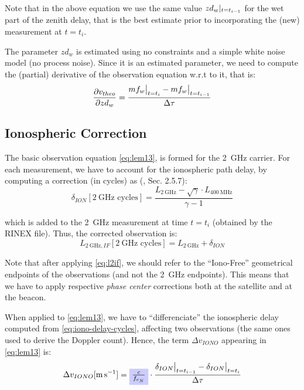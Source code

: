 Note that in the above equation we use the same value $zd_{w}\at{t=t_{i-1}}$ 
for the wet part of the zenith delay, that is the best estimate prior to 
incorporating the (new) measurement at $t=t_i$.

The parameter $zd_{w}$ is estimated using no constraints and a simple white 
noise model (no process noise). Since it is an estimated parameter, we need 
to compute the (partial) derivative of the observation equation w.r.t to it, 
that is:
\begin{equation}
  \frac{\partial v_{theo}}{\partial zd_{w}} = \frac{mf_{w}\at[\big]{t=t_i} 
    - mf_{w}\at[\big]{t=t_{i-1}}}{\Delta \tau}
\end{equation}

\subsection{Ionospheric Correction}
\label{ssec:iono-correction}
The basic observation equation \ref{eq:lem13}, is formed for the \SI{2}{\GHz} 
carrier. For each measurement, we have to account for the ionospheric path 
delay, by computing a correction (in cycles) as (\cite{lemoine-2016}, Sec. 2.5.7):
\begin{equation}
  \delta_{ION} [\SI{2}{\GHz}\text{ cycles}] = 
    \frac{L_{\SI{2}{\GHz}} - \sqrt{\gamma} \cdot L_{\SI{400}{\MHz}}}{\gamma - 1}
  \label{eq:iono-delay-cycles}
\end{equation}

which is added to the \SI{2}{\GHz} measurement at time $t=t_i$ (obtained by the 
RINEX file). Thus, the corrected observation is:
\begin{equation}
  L_{\SI{2}{\GHz},IF} [\SI{2}{\GHz}\text{ cycles}] = 
    L_{\SI{2}{\GHz}} + \delta_{ION}
  \label{eq:l2if}
\end{equation}

Note that after applying \ref{eq:l2if}, we should refer to the ``Iono-Free'' 
geometrical endpoints of the observations (and not the \SI{2}{\GHz} endpoints). 
This means that we have to apply respective \emph{phase center} corrections 
both at the satellite and at the beacon.

When applied to \ref{eq:lem13}, we have to ``differenciate'' the ionospheric 
delay computed from \ref{eq:iono-delay-cycles}, affecting two observations 
(the same ones used to derive the Doppler count). Hence, the term 
$\Delta v_{IONO}$ appearing in \ref{eq:lem13} is:
\begin{equation}
  \Delta v_{IONO} [\si{\m \per \s}] = 
    \tikz[baseline]{
      \node[fill=blue!20,anchor=base](en1){$\frac{c}{f_{e_N}}$};
    }
    \cdot 
    \frac{\delta_{ION}\at[\big]{t=t_{i-1}} 
    - \delta_{ION}\at[\big]{t=t_i}}{\Delta \tau}
  \label{eq:dion-diff}
\end{equation}

